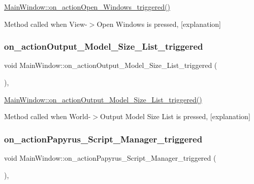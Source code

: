\hyperlink{class_main_window_a60eede6fe328bc95cccfe0c6d4a7696e}{Main\+Window\+::on\+\_\+action\+Open\+\_\+\+Windows\+\_\+triggered()} 

Method called when View-\/$>$Open Windows is pressed, \mbox{[}explanation\mbox{]} \mbox{\label{class_main_window_a9f15c0cb032a4c6914806b0feac5ff9d}} 
\subsubsection{\texorpdfstring{on\+\_\+action\+Output\+\_\+\+Model\+\_\+\+Size\+\_\+\+List\+\_\+triggered}{on\_actionOutput\_Model\_Size\_List\_triggered}}
{\footnotesize\ttfamily void Main\+Window\+::on\+\_\+action\+Output\+\_\+\+Model\+\_\+\+Size\+\_\+\+List\+\_\+triggered (\begin{DoxyParamCaption}{ }\end{DoxyParamCaption})\hspace{0.3cm}{\ttfamily [private]}, {\ttfamily [slot]}}



\hyperlink{class_main_window_a9f15c0cb032a4c6914806b0feac5ff9d}{Main\+Window\+::on\+\_\+action\+Output\+\_\+\+Model\+\_\+\+Size\+\_\+\+List\+\_\+triggered()} 

Method called when World-\/$>$Output Model Size List is pressed, \mbox{[}explanation\mbox{]} \mbox{\label{class_main_window_aff1e2e1ceb8705f368c624cec0407c12}} 
\subsubsection{\texorpdfstring{on\+\_\+action\+Papyrus\+\_\+\+Script\+\_\+\+Manager\+\_\+triggered}{on\_actionPapyrus\_Script\_Manager\_triggered}}
{\footnotesize\ttfamily void Main\+Window\+::on\+\_\+action\+Papyrus\+\_\+\+Script\+\_\+\+Manager\+\_\+triggered (\begin{DoxyParamCaption}{ }\end{DoxyParamCaption})\hspace{0.3cm}{\ttfamily [private]}, {\ttfamily [slot]}}



